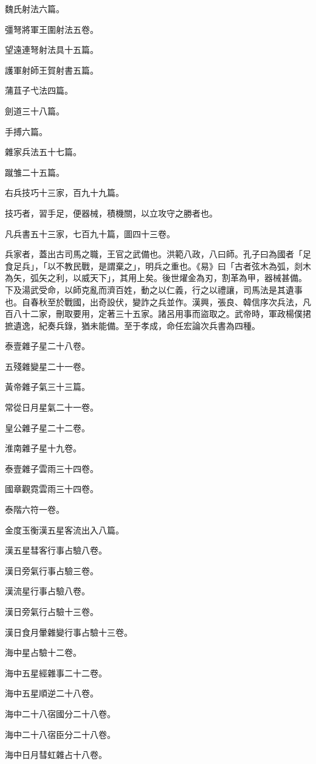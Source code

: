 \begin{pinyinscope}
魏氏射法六篇。

彊弩將軍王圍射法五卷。

望遠連弩射法具十五篇。

護軍射師王賀射書五篇。

蒲苴子弋法四篇。

劍道三十八篇。

手搏六篇。

雜家兵法五十七篇。

蹴雏二十五篇。

右兵技巧十三家，百九十九篇。

技巧者，習手足，便器械，積機關，以立攻守之勝者也。

凡兵書五十三家，七百九十篇，圖四十三卷。

兵家者，蓋出古司馬之職，王官之武備也。洪範八政，八曰師。孔子曰為國者「足食足兵」，「以不教民戰，是謂棄之」，明兵之重也。《易》曰「古者弦木為弧，剡木為矢，弧矢之利，以威天下」，其用上矣。後世燿金為刃，割革為甲，器械甚備。下及湯武受命，以師克亂而濟百姓，動之以仁義，行之以禮讓，司馬法是其遺事也。自春秋至於戰國，出奇設伏，變詐之兵並作。漢興，張良、韓信序次兵法，凡百八十二家，刪取要用，定著三十五家。諸呂用事而盜取之。武帝時，軍政楊僕捃摭遺逸，紀奏兵錄，猶未能備。至于孝成，命任宏論次兵書為四種。

泰壹雜子星二十八卷。

五殘雜變星二十一卷。

黃帝雜子氣三十三篇。

常從日月星氣二十一卷。

皇公雜子星二十二卷。

淮南雜子星十九卷。

泰壹雜子雲雨三十四卷。

國章觀霓雲雨三十四卷。

泰階六符一卷。

金度玉衡漢五星客流出入八篇。

漢五星彗客行事占驗八卷。

漢日旁氣行事占驗三卷。

漢流星行事占驗八卷。

漢日旁氣行占驗十三卷。

漢日食月暈雜變行事占驗十三卷。

海中星占驗十二卷。

海中五星經雜事二十二卷。

海中五星順逆二十八卷。

海中二十八宿國分二十八卷。

海中二十八宿臣分二十八卷。

海中日月彗虹雜占十八卷。


\end{pinyinscope}

